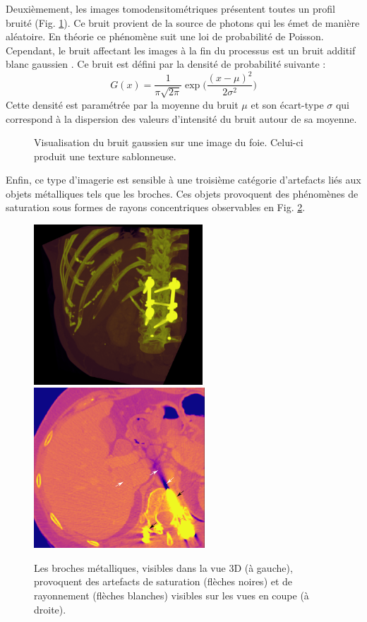 Deuxièmement, les images tomodensitométriques présentent toutes un profil bruité (Fig. \ref{fig:CT_noise}). Ce bruit provient de la source de photons qui les émet de manière aléatoire. En théorie ce phénomène suit une loi de probabilité de Poisson. Cependant, le bruit affectant les images à la fin du processus est un bruit additif blanc gaussien \cite{Lei1992_gaussianNoiseCT}. Ce bruit est défini par la densité de probabilité suivante :
\begin{equation}
G(x) = \frac{1}{\pi \sqrt{2\pi} } \exp\big( \frac{ (x-\mu)^2}{2\sigma^2} )    
\end{equation}
Cette densité est paramétrée par la moyenne du bruit $\mu$ et son écart-type $\sigma$ qui correspond à la dispersion des valeurs d'intensité du bruit autour de sa moyenne.
\begin{figure}
    \centering
    \caption{Visualisation du bruit gaussien sur une image du foie. Celui-ci produit une texture sablonneuse.}
    \label{fig:CT_noise}
\end{figure}

Enfin, ce type d'imagerie est sensible à une troisième catégorie d'artefacts liés aux objets métalliques tels que les broches. Ces objets provoquent des phénomènes de saturation sous formes de rayons concentriques observables en Fig. \ref{fig:metallic artefacts}.
\begin{figure}
    \centering
    \includegraphics[height=6cm]{Images/broaches_CT.png}
    \includegraphics[height=6cm]{Images/broaches_CT_slice_arrow.png}
    \caption{Les broches métalliques, visibles dans la vue 3D (à gauche), provoquent des artefacts de saturation (flèches noires) et de rayonnement (flèches blanches) visibles sur les vues en coupe (à droite).}
    \label{fig:metallic artefacts}
\end{figure}

